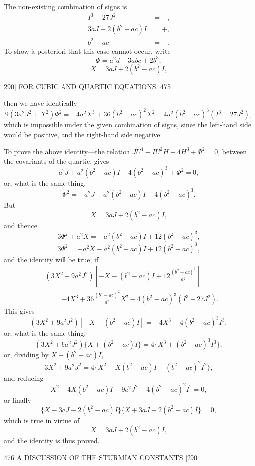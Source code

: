\documentclass[11pt]{article}
\begin{document}
The non-existing combination of signs is
\begin{align*}
I^{3}-27J^{2} &= -,\\
3aJ+2(b^{2}-ac)I &= +,\\
b^{2}-ac &= -.
\end{align*}
To show \`a posteriori that this case cannot occur, write
\[ \Psi=a^{2}d-3abc+2b^{3}, \]
\[ X=3aJ+2(b^{2}-ac)I, \]

\begin{center}
\textsc{290]} \hfill FOR CUBIC AND QUARTIC EQUATIONS. \hfill 475
\end{center}

then we have identically
\[ 9(3a^{2}J^{2}+X^{2})\Psi^{2}=-4a^{2}X^{3}+36(b^{2}-ac)^{2}X^{2}-4a^{2}(b^{2}-ac)^{3}(I^{3}-27J^{2}), \]
which is impossible under the given combination of signs, since the left-hand side
would be positive, and the right-hand side negative.

\smallskip

To prove the above identity---the relation $JU^{4}-IU^{2}H+4H^{3}+\Phi^{2}=0$, between the
covariants of the quartic, gives
\[ a^{2}J+a^{2}(b^{2}-ac)I-4(b^{2}-ac)^{3}+\Phi^{2}=0, \]
or, what is the same thing,
\[ \Phi^{2}=-a^{2}J-a^{2}(b^{2}-ac)I+4(b^{2}-ac)^{3}. \]
But
\[ X=3aJ+2(b^{2}-ac)I, \]
and thence
\[ 3\Phi^{2}+a^{2}X=-a^{2}(b^{2}-ac)I+12(b^{2}-ac)^{3}, \]
\[ 3\Phi^{2}=-a^{2}X-a^{2}(b^{2}-ac)I+12(b^{2}-ac)^{3}, \]
and the identity will be true, if
\begin{align*}
& (3X^{2}+9a^{2}J^{2})\left[-X-(b^{2}-ac)I+12\frac{(b^{2}-ac)^{3}}{a^{2}}\right] \\
& \quad =-4X^{3}+36\frac{(b^{2}-ac)^{2}}{a^{2}}X^{2}-4(b^{2}-ac)^{3}(I^{3}-27J^{2}).
\end{align*}
This gives
\[ (3X^{2}+9a^{2}J^{2})[-X-(b^{2}-ac)I]=-4X^{3}-4(b^{2}-ac)^{3}I^{3}, \]
or, what is the same thing,
\[ (3X^{2}+9a^{2}J^{2})\{X+(b^{2}-ac)I\}=4\{X^{3}+(b^{2}-ac)^{3}I^{3}\}, \]
or, dividing by $X+(b^{2}-ac)I$,
\[ 3X^{2}+9a^{2}J^{2}=4\{X^{2}-X(b^{2}-ac)I+(b^{2}-ac)^{2}I^{2}\}, \]
and reducing
\[ X^{2}-4X(b^{2}-ac)I-9a^{2}J^{2}+4(b^{2}-ac)^{2}I^{2}=0, \]
or finally
\[ \{X-3aJ-2(b^{2}-ac)I\}\{X+3aJ-2(b^{2}-ac)I\}=0, \]
which is true in virtue of
\[ X=3aJ+2(b^{2}-ac)I, \]
and the identity is thus proved.

\begin{center}
476 \hfill A DISCUSSION OF THE STURMIAN CONSTANTS \hfill \textsc{[290}
\end{center}
\end{document}
